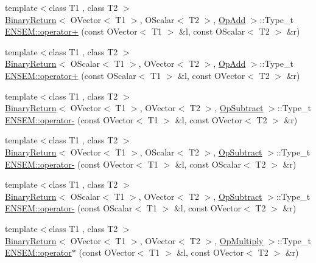 \begin{DoxyCompactItemize}
\item 
{\footnotesize template$<$class T1 , class T2 $>$ }\\\mbox{\hyperlink{structBinaryReturn}{Binary\+Return}}$<$ O\+Vector$<$ T1 $>$, O\+Scalar$<$ T2 $>$, \mbox{\hyperlink{structOpAdd}{Op\+Add}} $>$\+::Type\+\_\+t \mbox{\hyperlink{group__obsvector_gaff6b0407180422eb54c7c31f17d340e3}{E\+N\+S\+E\+M\+::operator+}} (const O\+Vector$<$ T1 $>$ \&l, const O\+Scalar$<$ T2 $>$ \&r)
\item 
{\footnotesize template$<$class T1 , class T2 $>$ }\\\mbox{\hyperlink{structBinaryReturn}{Binary\+Return}}$<$ O\+Scalar$<$ T1 $>$, O\+Vector$<$ T2 $>$, \mbox{\hyperlink{structOpAdd}{Op\+Add}} $>$\+::Type\+\_\+t \mbox{\hyperlink{group__obsvector_ga19b9d8af56a96f2d3b3455fe4ec1f98f}{E\+N\+S\+E\+M\+::operator+}} (const O\+Scalar$<$ T1 $>$ \&l, const O\+Vector$<$ T2 $>$ \&r)
\item 
{\footnotesize template$<$class T1 , class T2 $>$ }\\\mbox{\hyperlink{structBinaryReturn}{Binary\+Return}}$<$ O\+Vector$<$ T1 $>$, O\+Vector$<$ T2 $>$, \mbox{\hyperlink{structOpSubtract}{Op\+Subtract}} $>$\+::Type\+\_\+t \mbox{\hyperlink{group__obsvector_ga928e3f4f9c8ac492925b3d1a78d11216}{E\+N\+S\+E\+M\+::operator-\/}} (const O\+Vector$<$ T1 $>$ \&l, const O\+Vector$<$ T2 $>$ \&r)
\item 
{\footnotesize template$<$class T1 , class T2 $>$ }\\\mbox{\hyperlink{structBinaryReturn}{Binary\+Return}}$<$ O\+Vector$<$ T1 $>$, O\+Scalar$<$ T2 $>$, \mbox{\hyperlink{structOpSubtract}{Op\+Subtract}} $>$\+::Type\+\_\+t \mbox{\hyperlink{group__obsvector_ga99ab390926e54bd5fb8ad9265047f9cb}{E\+N\+S\+E\+M\+::operator-\/}} (const O\+Vector$<$ T1 $>$ \&l, const O\+Scalar$<$ T2 $>$ \&r)
\item 
{\footnotesize template$<$class T1 , class T2 $>$ }\\\mbox{\hyperlink{structBinaryReturn}{Binary\+Return}}$<$ O\+Scalar$<$ T1 $>$, O\+Vector$<$ T2 $>$, \mbox{\hyperlink{structOpSubtract}{Op\+Subtract}} $>$\+::Type\+\_\+t \mbox{\hyperlink{group__obsvector_gaa851105d0e0292f6a8503c61aafb6bb8}{E\+N\+S\+E\+M\+::operator-\/}} (const O\+Scalar$<$ T1 $>$ \&l, const O\+Vector$<$ T2 $>$ \&r)
\item 
{\footnotesize template$<$class T1 , class T2 $>$ }\\\mbox{\hyperlink{structBinaryReturn}{Binary\+Return}}$<$ O\+Vector$<$ T1 $>$, O\+Vector$<$ T2 $>$, \mbox{\hyperlink{structOpMultiply}{Op\+Multiply}} $>$\+::Type\+\_\+t \mbox{\hyperlink{group__obsvector_gaa0cd2e75ed42d1c8d749cbc22ea5d244}{E\+N\+S\+E\+M\+::operator$\ast$}} (const O\+Vector$<$ T1 $>$ \&l, const O\+Vector$<$ T2 $>$ \&r)

\end{DoxyCompactItemize}
